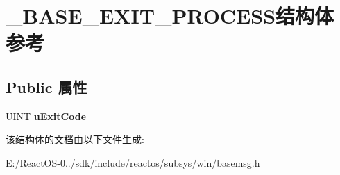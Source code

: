 \hypertarget{struct___b_a_s_e___e_x_i_t___p_r_o_c_e_s_s}{}\section{\+\_\+\+B\+A\+S\+E\+\_\+\+E\+X\+I\+T\+\_\+\+P\+R\+O\+C\+E\+S\+S结构体 参考}
\label{struct___b_a_s_e___e_x_i_t___p_r_o_c_e_s_s}
\subsection*{Public 属性}
\begin{DoxyCompactItemize}
\item 
\mbox{\label{struct___b_a_s_e___e_x_i_t___p_r_o_c_e_s_s_ac2d17e4e32b0c6ba9bd3cb4da88c3c10}} 
U\+I\+NT {\bfseries u\+Exit\+Code}
\end{DoxyCompactItemize}


该结构体的文档由以下文件生成\+:\begin{DoxyCompactItemize}
\item 
E\+:/\+React\+O\+S-\/0../sdk/include/reactos/subsys/win/basemsg.\+h\end{DoxyCompactItemize}
